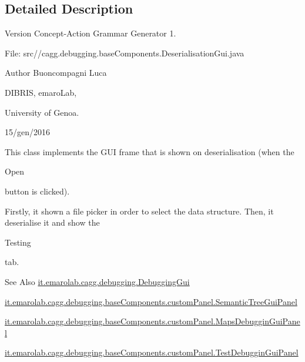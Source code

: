 \subsection{Detailed Description}
\begin{DoxyVersion}{Version}
Concept-\/\-Action Grammar Generator 1. \par
 File\-: src//cagg.debugging.\-base\-Components.\-Deserialisation\-Gui.\-java \par

\end{DoxyVersion}
\begin{DoxyAuthor}{Author}
Buoncompagni Luca \par
 D\-I\-B\-R\-I\-S, emaro\-Lab,\par
 University of Genoa. \par
 15/gen/2016 \par

\end{DoxyAuthor}


This class implements the G\-U\-I frame that is shown on deserialisation (when the
\begin{DoxyCode}
Open 
\end{DoxyCode}
 button is clicked).\par
 Firstly, it shown a file picker in order to select the data structure. Then, it deserialise it and show the
\begin{DoxyCode}
Testing 
\end{DoxyCode}
 tab. 

\begin{DoxySeeAlso}{See Also}
\hyperlink{classit_1_1emarolab_1_1cagg_1_1debugging_1_1DebuggingGui}{it.\-emarolab.\-cagg.\-debugging.\-Debugging\-Gui} 

\hyperlink{classit_1_1emarolab_1_1cagg_1_1debugging_1_1baseComponents_1_1customPanel_1_1SemanticTreeGuiPanel}{it.\-emarolab.\-cagg.\-debugging.\-base\-Components.\-custom\-Panel.\-Semantic\-Tree\-Gui\-Panel} 

\hyperlink{classit_1_1emarolab_1_1cagg_1_1debugging_1_1baseComponents_1_1customPanel_1_1MapsDebugginGuiPanel}{it.\-emarolab.\-cagg.\-debugging.\-base\-Components.\-custom\-Panel.\-Maps\-Debuggin\-Gui\-Panel} 

\hyperlink{classit_1_1emarolab_1_1cagg_1_1debugging_1_1baseComponents_1_1customPanel_1_1TestDebugginGuiPanel}{it.\-emarolab.\-cagg.\-debugging.\-base\-Components.\-custom\-Panel.\-Test\-Debuggin\-Gui\-Panel} 
\end{DoxySeeAlso}


